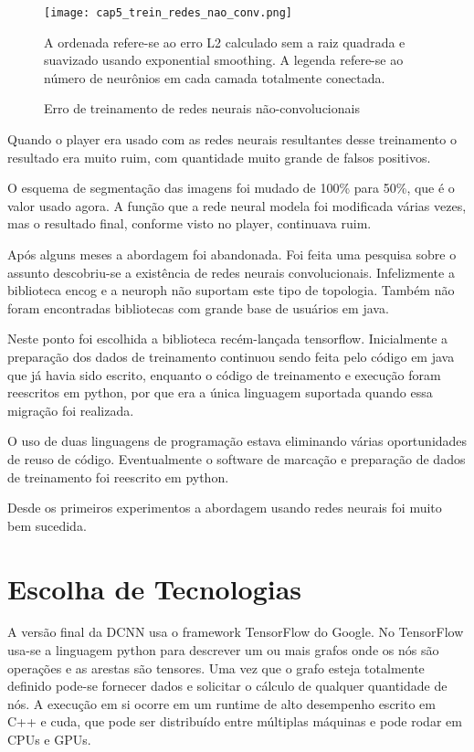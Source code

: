 \begin{figure}[!htb]
	\centering
	\texttt{[image: cap5\_trein\_redes\_nao\_conv.png]}
	\caption{Erro de treinamento de redes neurais não-convolucionais}
	\label{fig:cap5_trein_redes_nao_conv}
	A ordenada refere-se ao erro L2 calculado sem a raiz quadrada e suavizado
	usando exponential smoothing. A legenda refere-se ao número de neurônios
	em cada camada totalmente conectada.
\end{figure}


Quando o player era usado com as redes neurais resultantes desse treinamento o
resultado era muito ruim, com quantidade muito grande de falsos positivos.

O esquema de segmentação das imagens foi mudado de 100\% para 50\%, que é o
valor usado agora. A função que a rede neural modela foi modificada
várias vezes, mas
o resultado final, conforme visto no player, continuava ruim.

Após alguns meses a abordagem foi abandonada. Foi feita uma pesquisa sobre o
assunto descobriu-se a existência de redes neurais convolucionais. Infelizmente
a biblioteca encog e a neuroph não suportam este tipo de topologia. Também não
foram encontradas bibliotecas com grande base de usuários em java.

Neste ponto foi escolhida a biblioteca recém-lançada tensorflow. Inicialmente a
preparação dos dados de treinamento continuou sendo feita pelo código em java
que já havia sido escrito, enquanto o código de treinamento e execução foram
reescritos em python, por que era a única linguagem suportada quando essa
migração foi realizada.

O uso de duas linguagens de programação estava eliminando várias oportunidades
de reuso de código. Eventualmente o software de marcação e preparação de dados
de treinamento foi reescrito em python.

Desde os primeiros experimentos a abordagem usando redes neurais foi muito bem
sucedida.

\section{Escolha de Tecnologias}
A versão final da DCNN usa o framework TensorFlow do Google.
No TensorFlow usa-se a linguagem python para descrever um ou mais grafos onde
os nós são operações e as arestas são tensores. Uma vez que o grafo esteja
totalmente definido pode-se fornecer dados e solicitar o cálculo de qualquer
quantidade de nós. A execução em si ocorre em um runtime de alto desempenho
escrito em C++ e cuda, que pode ser distribuído entre múltiplas máquinas e pode
rodar em CPUs e GPUs.

